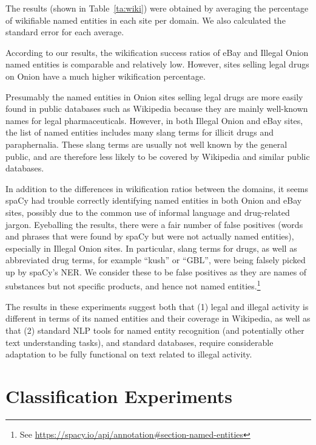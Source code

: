 \documentclass[11pt,a4paper,table]{article}
\begin{document}
The results (shown in Table~\ref{ta:wiki}) were obtained by averaging the percentage of wikifiable named entities in each site per domain. We also calculated the standard error for each average.

According to our results, the wikification success ratios of eBay and Illegal Onion named entities is comparable and relatively low. However, sites selling legal drugs on Onion have a much higher wikification percentage.

Presumably the named entities in Onion sites selling legal drugs are
more easily found in public databases such as Wikipedia because they
are mainly well-known names for legal pharmaceuticals. However, in
both Illegal Onion and eBay sites, the list of named entities includes
many slang terms for illicit drugs and paraphernalia. These slang terms
are usually not well known by the general public, and are therefore
less likely to be covered by Wikipedia and similar public databases.


In addition to the differences in wikification ratios between
the domains, it seems spaCy had trouble correctly identifying
named entities in both Onion and eBay sites, possibly
due to the common use of informal language and drug-related jargon.
Eyeballing the results, there were a fair number of false positives (words and phrases that were found by spaCy but were not actually named entities),
especially in Illegal Onion sites.
In particular, slang terms for drugs, as well as abbreviated drug terms, for example ``kush'' or ``GBL'',
were being falsely picked up by spaCy's NER.
We consider these to be false positives as they are names of substances but not specific products, and hence not named entities.\footnote{See \url{https://spacy.io/api/annotation\#section-named-entities}}

 The results in these experiments suggest both that (1) legal and illegal activity is different in terms of its named entities and their coverage in Wikipedia, as well as that (2) standard NLP tools for named entity recognition (and potentially other text understanding tasks), and standard databases, require considerable adaptation to be fully functional on text related to illegal activity.


\section{Classification Experiments} \label{sec:classification}
\end{document}
